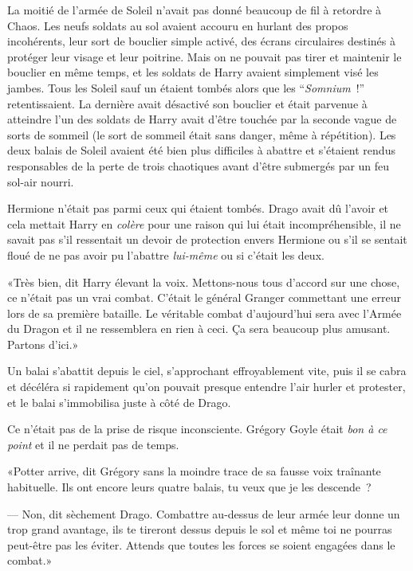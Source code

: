 La moitié de l'armée de Soleil n'avait pas donné beaucoup de fil à retordre à Chaos. Les neufs soldats au sol avaient accouru en hurlant des propos incohérents, leur sort de bouclier simple activé, des écrans circulaires destinés à protéger leur visage et leur poitrine. Mais on ne pouvait pas tirer et maintenir le bouclier en même temps, et les soldats de Harry avaient simplement visé les jambes. Tous les Soleil sauf un étaient tombés alors que les “\emph{Somnium}~!” retentissaient. La dernière avait désactivé son bouclier et était parvenue à atteindre l'un des soldats de Harry avait d'être touchée par la seconde vague de sorts de sommeil (le sort de sommeil était sans danger, même à répétition). Les deux balais de Soleil avaient été bien plus difficiles à abattre et s'étaient rendus responsables de la perte de trois chaotiques avant d'être submergés par un feu sol-air nourri.

Hermione n'était pas parmi ceux qui étaient tombés. Drago avait dû l'avoir et cela mettait Harry en \emph{colère} pour une raison qui lui était incompréhensible, il ne savait pas s'il ressentait un devoir de protection envers Hermione ou s'il se sentait floué de ne pas avoir pu l'abattre \emph{lui-même} ou si c'était les deux.

«Très bien, dit Harry élevant la voix. Mettons-nous tous d'accord sur une chose, ce n'était pas un vrai combat. C'était le général Granger commettant une erreur lors de sa première bataille. Le véritable combat d'aujourd'hui sera avec l'Armée du Dragon et il ne ressemblera en rien à ceci. Ça sera beaucoup plus amusant. Partons d'ici.»

\later

Un balai s'abattit depuis le ciel, s'approchant effroyablement vite, puis il se cabra et décéléra si rapidement qu'on pouvait presque entendre l'air hurler et protester, et le balai s'immobilisa juste à côté de Drago.

Ce n'était pas de la prise de risque inconsciente. Grégory Goyle était \emph{bon à ce point} et il ne perdait pas de temps.

«Potter arrive, dit Grégory sans la moindre trace de sa fausse voix traînante habituelle. Ils ont encore leurs quatre balais, tu veux que je les descende~?

--- Non, dit sèchement Drago. Combattre au-dessus de leur armée leur donne un trop grand avantage, ils te tireront dessus depuis le sol et même toi ne pourras peut-être pas les éviter. Attends que toutes les forces se soient engagées dans le combat.»

